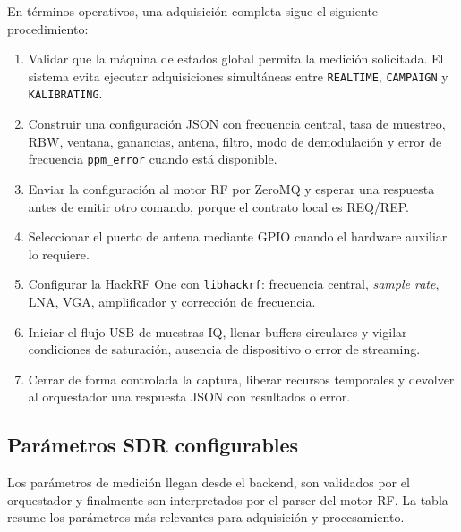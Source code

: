 En términos operativos, una adquisición completa sigue el siguiente procedimiento:

\begin{enumerate}
  \item Validar que la máquina de estados global permita la medición solicitada.
  El sistema evita ejecutar adquisiciones simultáneas entre \texttt{REALTIME},
  \texttt{CAMPAIGN} y \texttt{KALIBRATING}.

  \item Construir una configuración JSON con frecuencia central, tasa de muestreo,
  RBW, ventana, ganancias, antena, filtro, modo de demodulación y error de
  frecuencia \texttt{ppm\_error} cuando está disponible.

  \item Enviar la configuración al motor RF por ZeroMQ y esperar una respuesta
  antes de emitir otro comando, porque el contrato local es REQ/REP.

  \item Seleccionar el puerto de antena mediante GPIO cuando el hardware auxiliar
  lo requiere.

  \item Configurar la HackRF One con \texttt{libhackrf}: frecuencia central,
  \textit{sample rate}, LNA, VGA, amplificador y corrección de frecuencia.

  \item Iniciar el flujo USB de muestras IQ, llenar buffers circulares y vigilar
  condiciones de saturación, ausencia de dispositivo o error de streaming.

  \item Cerrar de forma controlada la captura, liberar recursos temporales y
  devolver al orquestador una respuesta JSON con resultados o error.
\end{enumerate}

\subsection{Parámetros SDR configurables}

Los parámetros de medición llegan desde el backend, son validados por el
orquestador y finalmente son interpretados por el parser del motor RF. La tabla
resume los parámetros más relevantes para adquisición y procesamiento.

